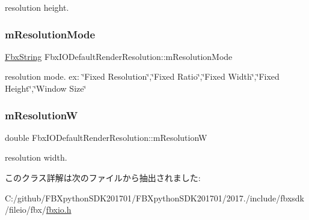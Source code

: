 resolution height. \mbox{\label{class_fbx_i_o_default_render_resolution_a9c5e1f0ab623fe67690f95517665ebca}} 
\subsubsection{\texorpdfstring{m\+Resolution\+Mode}{mResolutionMode}}
{\footnotesize\ttfamily \hyperlink{class_fbx_string}{Fbx\+String} Fbx\+I\+O\+Default\+Render\+Resolution\+::m\+Resolution\+Mode}

resolution mode. ex\+: \char`\"{}\+Fixed Resolution\char`\"{},\char`\"{}\+Fixed Ratio\char`\"{},\char`\"{}\+Fixed Width\char`\"{},\char`\"{}\+Fixed Height\char`\"{},\char`\"{}\+Window Size\char`\"{} \mbox{\label{class_fbx_i_o_default_render_resolution_a1d437196200a13c117228782e95102bd}} 
\subsubsection{\texorpdfstring{m\+ResolutionW}{mResolutionW}}
{\footnotesize\ttfamily double Fbx\+I\+O\+Default\+Render\+Resolution\+::m\+ResolutionW}

resolution width. 

このクラス詳解は次のファイルから抽出されました\+:\begin{DoxyCompactItemize}
\item 
C\+:/github/\+F\+B\+Xpython\+S\+D\+K201701/\+F\+B\+Xpython\+S\+D\+K201701/2017./include/fbxsdk/fileio/fbx/\hyperlink{fbxio_8h}{fbxio.\+h}\end{DoxyCompactItemize}
